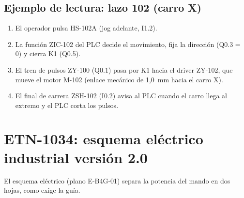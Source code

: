 \documentclass[a4paper,11pt]{article}
\begin{document}
\subsection{Ejemplo de lectura: lazo 102 (carro X)}
\begin{enumerate}
\item El operador pulsa HS-102A (jog adelante, I1.2).
\item La función ZIC-102 del PLC decide el movimiento, fija la dirección (Q0.3 = 0) y cierra K1 (Q0.5).
\item El tren de pulsos ZY-100 (Q0.1) pasa por K1 hacia el driver ZY-102, que mueve el motor M-102 (enlace mecánico de 1,0~mm hacia el carro X).
\item El final de carrera ZSH-102 (I0.2) avisa al PLC cuando el carro llega al extremo y el PLC corta los pulsos.
\end{enumerate}

\section{ETN-1034: esquema eléctrico industrial versión 2.0}
El esquema eléctrico (plano E-B4G-01) separa la potencia del mando en dos hojas, como exige la guía.


\end{document}
